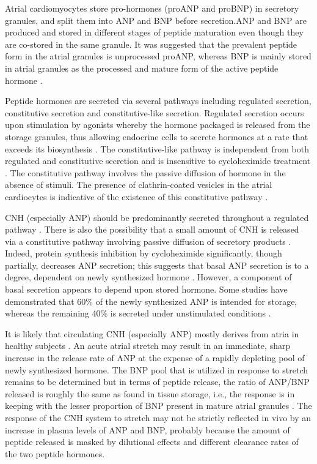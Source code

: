 \documentclass[14pt,a4paper,onecolumn]{extarticle}
\begin{document}
Atrial cardiomyocytes store pro-hormones (proANP and proBNP) in secretory granules, and split them into ANP and BNP before secretion.ANP and BNP are produced and stored in different stages of peptide maturation even though they are co-stored in the same granule. It was suggested that the prevalent peptide form in the atrial granules is unprocessed proANP, whereas BNP is mainly stored in atrial granules as the processed and mature form of the active peptide hormone \citep{12} \citep{13} \citep{18}.

Peptide hormones are secreted via several pathways including regulated secretion, constitutive secretion and constitutive-like secretion. Regulated secretion occurs upon stimulation by agonists whereby the hormone packaged is released from the storage granules, thus allowing endocrine cells to secrete hormones at a rate that exceeds its biosynthesis \citep{13}. The constitutive-like pathway is independent from both regulated and constitutive secretion and is insensitive to cycloheximide treatment \citep{13}. The constitutive pathway involves the passive diffusion of hormone in the absence of stimuli.  The presence of clathrin-coated vesicles in the atrial cardiocytes is indicative of the existence of this constitutive pathway \citep{13}.

CNH (especially ANP) should be predominantly secreted throughout a regulated pathway \citep{12} \citep{13} \citep{18}. There is also the possibility that a small amount of CNH is released via a constitutive pathway involving passive diffusion of secretory products \citep{12} \citep{13} \citep{18}.  Indeed, protein synthesis inhibition by cycloheximide significantly, though partially, decreases ANP secretion; this suggests that basal ANP secretion is to a degree, dependent on newly synthesized hormone \citep{13}. However, a component of basal secretion appears to depend upon stored hormone. Some studies have demonstrated that 60\% of the newly synthesized ANP is intended for storage, whereas the remaining 40\% is secreted under unstimulated conditions \citep{13}.

It is likely that circulating CNH (especially ANP) mostly derives from atria in healthy subjects \citep{12} \citep{13} \citep{14} \citep{18}. An acute atrial stretch may result in an immediate, sharp increase in the release rate of ANP at the expense of a rapidly depleting pool of newly synthesized hormone. The BNP pool that is utilized in response to stretch remains to be determined but in terms of peptide release, the ratio of ANP/BNP released is roughly the same as found in tissue storage, i.e., the response is in keeping with the lesser proportion of BNP present in mature atrial granules \citep{18}. The response of the CNH system to stretch may not be strictly reflected in vivo by an increase in plasma levels of ANP and BNP, probably because the amount of peptide released is masked by dilutional effects and different clearance rates of the two peptide hormones.
\end{document}
